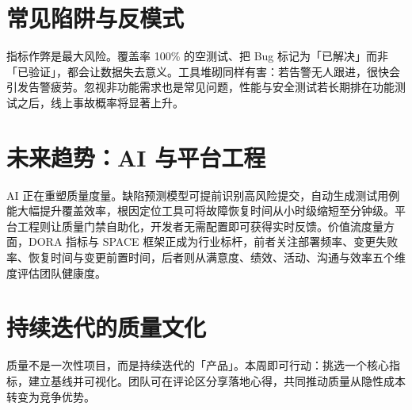 \chapter{常见陷阱与反模式}
指标作弊是最大风险。覆盖率 100\%{} 的空测试、把 Bug 标记为「已解决」而非「已验证」，都会让数据失去意义。工具堆砌同样有害：若告警无人跟进，很快会引发告警疲劳。忽视非功能需求也是常见问题，性能与安全测试若长期排在功能测试之后，线上事故概率将显著上升。\par
\chapter{未来趋势：AI 与平台工程}
AI 正在重塑质量度量。缺陷预测模型可提前识别高风险提交，自动生成测试用例能大幅提升覆盖效率，根因定位工具可将故障恢复时间从小时级缩短至分钟级。平台工程则让质量门禁自助化，开发者无需配置即可获得实时反馈。价值流度量方面，DORA 指标与 SPACE 框架正成为行业标杆，前者关注部署频率、变更失败率、恢复时间与变更前置时间，后者则从满意度、绩效、活动、沟通与效率五个维度评估团队健康度。\par
\chapter{持续迭代的质量文化}
质量不是一次性项目，而是持续迭代的「产品」。本周即可行动：挑选一个核心指标，建立基线并可视化。团队可在评论区分享落地心得，共同推动质量从隐性成本转变为竞争优势。\par
